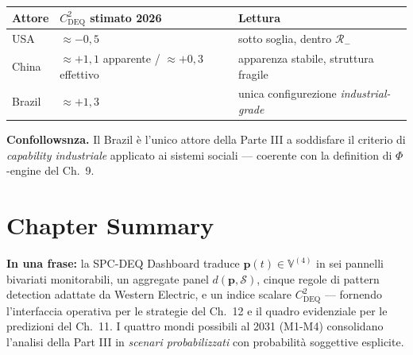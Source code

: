 {\def\LTcaptype{none} %
{\small\begin{longtable}[]{@{}
  >{\raggedright\arraybackslash}p{}
  >{\raggedright\arraybackslash}p{}
  >{\raggedright\arraybackslash}p{}@{}}
\toprule\noalign{}
\begin{minipage}[b]{\linewidth}\raggedright
Attore
\end{minipage} & \begin{minipage}[b]{\linewidth}\raggedright
\(C_{\text{DEQ}}^2\) stimato 2026
\end{minipage} & \begin{minipage}[b]{\linewidth}\raggedright
Lettura
\end{minipage} \\
\midrule\noalign{}
\endhead
\bottomrule\noalign{}
\endlastfoot
USA & \(\approx -0{,}5\) & sotto soglia, dentro \(\mathcal{R}_-\) \\
China & \(\approx +1{,}1\) apparente / \(\approx +0{,}3\) effettivo &
apparenza stabile, struttura fragile \\
Brazil & \(\approx +1{,}3\) & unica configurezione
\emph{industrial-grade} \\
\end{longtable}}
}

\Hypoth{} \textbf{Confollowsnza.} Il Brazil è l'unico attore della Parte
III a soddisfare il criterio di \emph{capability industriale} applicato
ai sistemi sociali --- coerente con la definition di \(\Phi\)-engine
del Ch.~9.



\section{Chapter Summary}\label{sintesi-del-chapter}

\Proved{} \textbf{In una frase:} la SPC-DEQ Dashboard traduce
\(\boldsymbol{p}(t) \in \mathbb{V}^{(4)}\) in sei pannelli bivariati
monitorabili, un aggregate panel \(d(\boldsymbol{p}, \mathcal{S})\),
cinque regole di pattern detection adattate da Western Electric, e un
indice scalare \(C_{\text{DEQ}}^2\) --- fornendo l'interfaccia operativa
per le strategie del Ch.~12 e il quadro evidenziale per le predizioni
del Ch.~11. I quattro mondi possibili al 2031 (M1-M4) consolidano
l'analisi della Part III in \emph{scenari probabilizzati} con
probabilità soggettive esplicite.

